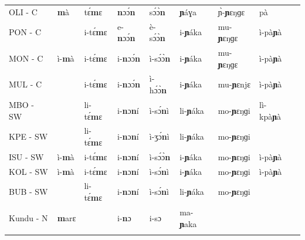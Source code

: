 \documentclass[output=paper,colorlinks,citecolor=brown
]{langscibook}
\begin{document}
\begin{table}[p]
{\begin{tabular}{lllllllll}
OLI - C                   & \textbf{m}à                       & tɛ́\textbf{m}ɛ                   & \textbf{n}ɔɔ́\textbf{n}                  & sɔ́ɔ̀\textbf{n}                  & \textbf{ɲ}áɣa                       & ɲ̀-\textbf{ɲ}ɛŋɡɛ                    & pà                     \\
PON - C                   &                          & i-tɛ́\textbf{m}ɛ                 & e-\textbf{n}ɔɔ́\textbf{n}                & è-sɔ́ɔ̀\textbf{n}               & i-\textbf{ɲ}áka                      & mu-\textbf{ɲ}ɛŋɡɛ                    & ì-pà\textbf{ɲ}à               \\
MON - C                   & ì-\textbf{m}à                     & i-tɛ́\textbf{m}ɛ                 & i-\textbf{n}ɔɔ́\textbf{n}                & ì-sɔ́ɔ̀\textbf{n}               & i-\textbf{ɲ}áka                      & mu-\textbf{ɲ}ɛŋɡɛ                    & ì-pà\textbf{ɲ}à               \\
MUL - C                   &                          & i-tɛ́\textbf{m}ɛ                 & i-\textbf{n}ɔɔ́\textbf{n}                & ì-hɔ́ɔ̀\textbf{n}               & i-\textbf{ɲ}áka                      & mu-\textbf{ɲ}ɛnjɛ                    & ì-pà\textbf{ɲ}à               \\
MBO - SW                  &                          & li-tɛ́\textbf{m}ɛ                & i-\textbf{n}ɔ\textbf{n}í                & ì-sɔ́\textbf{n}ì               & li-\textbf{ɲ}áka                     & mo-\textbf{ɲ}ɛŋɡi                    & lì-kpà\textbf{ɲ}à             \\
KPE - SW                  &                          & li-tɛ́\textbf{m}ɛ                & i-\textbf{n}ɔ\textbf{n}í                & ì-ʒɔ́\textbf{n}ì               & li-\textbf{ɲ}áka                     & mo-\textbf{ɲ}ɛŋɡi                    &                         \\
ISU - SW                  & ì-\textbf{m}à                     & i-tɛ́\textbf{m}ɛ                 & i-\textbf{n}ɔ\textbf{n}í                & ì-sɔ́ɔ̀\textbf{n}               & i-\textbf{ɲ}áka                      & mo-\textbf{ɲ}ɛŋɡi                    & ì-pà\textbf{ɲ}à               \\
KOL - SW                  & ì-\textbf{m}à                     & i-tɛ́\textbf{m}ɛ                 & i-\textbf{n}ɔ\textbf{n}í                & ì-sɔ́\textbf{n}ì               & i-\textbf{ɲ}áka                      & mo-\textbf{ɲ}ɛŋɡi                    & ì-pà\textbf{ɲ}à               \\
BUB - SW                  &                          & li-tɛ́\textbf{m}ɛ                & i-\textbf{n}ɔ\textbf{n}í                & ì-sɔ́\textbf{n}ì               & li-\textbf{ɲ}áka                     & mo-\textbf{ɲ}ɛŋɡi                    &                         \\
Kundu - N                 & \textbf{m}arɛ                     &                         & i-\textbf{n}ɔ                   & i-sɔ                    & ma-\textbf{ɲ}aka                     &                             &               \\ 
   \lspbottomrule
 \end{tabular}
 }
\end{table}
\end{document}

